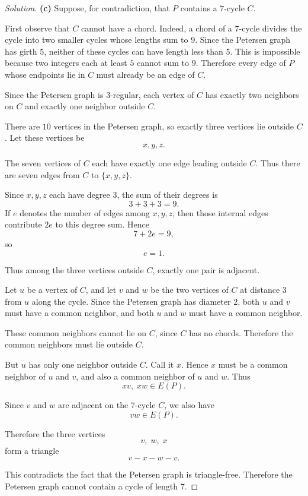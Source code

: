 \documentclass[12pt]{amsart}
\theoremstyle{conjecture}
\theoremstyle{definition}
\theoremstyle{question}
\theoremstyle{theorem}
\newenvironment{solution}
{\begin{proof}[Solution]}
{\end{proof}}
\begin{document}
\begin{solution}
        \noindent
        \textbf{(c)} Suppose, for contradiction, that $P$ contains a
        $7$-cycle $C$.

        First observe that $C$ cannot have a chord. Indeed, a chord of a
        $7$-cycle divides the cycle into two smaller cycles whose lengths
        sum to $9$. Since the Petersen graph has girth $5$, neither of
        these cycles can have length less than $5$. This is impossible
        because two integers each at least $5$ cannot sum to $9$.
        Therefore every edge of $P$ whose endpoints lie in $C$ must
        already be an edge of $C$.

        Since the Petersen graph is $3$-regular, each vertex of $C$ has
        exactly two neighbors on $C$ and exactly one neighbor outside
        $C$.

        There are $10$ vertices in the Petersen graph, so exactly three
        vertices lie outside $C$. Let these vertices be
        \[
            x,y,z.
        \]

        The seven vertices of $C$ each have exactly one edge leading
        outside $C$. Thus there are seven edges from $C$ to
        $\{x,y,z\}$.

        Since $x,y,z$ each have degree $3$, the sum of their degrees is
        \[
            3+3+3=9.
        \]
        If $e$ denotes the number of edges among $x,y,z$, then those
        internal edges contribute $2e$ to this degree sum. Hence
        \[
            7+2e=9,
        \]
        so
        \[
            e=1.
        \]

        Thus among the three vertices outside $C$, exactly one pair is
        adjacent.

        Let $u$ be a vertex of $C$, and let $v$ and $w$ be the two
        vertices of $C$ at distance $3$ from $u$ along the cycle. Since
        the Petersen graph has diameter $2$, both $u$ and $v$ must have
        a common neighbor, and both $u$ and $w$ must have a common
        neighbor.

        These common neighbors cannot lie on $C$, since $C$ has no
        chords. Therefore the common neighbors must lie outside $C$.

        But $u$ has only one neighbor outside $C$. Call it $x$. Hence
        $x$ must be a common neighbor of $u$ and $v$, and also a common
        neighbor of $u$ and $w$. Thus
        \[
            xv,\;xw\in E(P).
        \]

        Since $v$ and $w$ are adjacent on the $7$-cycle $C$, we also have
        \[
            vw\in E(P).
        \]

        Therefore the three vertices
        \[
            v,\;w,\;x
        \]
        form a triangle
        \[
            v-x-w-v.
        \]

        This contradicts the fact that the Petersen graph is
        triangle-free. Therefore the Petersen graph cannot contain a
        cycle of length $7$.
    \end{solution}
\end{document}
